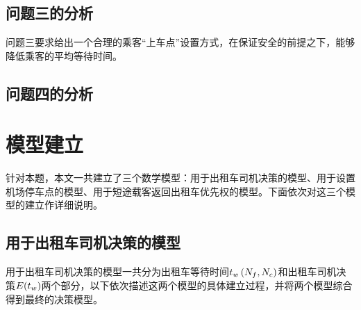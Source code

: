 \documentclass{cumcm}
\begin{document}
\subsection{问题三的分析}
问题三要求给出一个合理的乘客“上车点”设置方式，在保证安全的前提之下，能够降低乘客的平均等待时间。
\subsection{问题四的分析}

\section{模型建立}
针对本题，本文一共建立了三个数学模型：用于出租车司机决策的模型、用于设置机场停车点的模型、用于短途载客返回出租车优先权的模型。下面依次对这三个模型的建立作详细说明。
\subsection{用于出租车司机决策的模型}
用于出租车司机决策的模型一共分为出租车等待时间$\mbox{$t_w$}\left(\mbox{$N_f$},\mbox{$N_c$}\right)$和出租车司机决策$E(\mbox{$t_w$})$两个部分，以下依次描述这两个模型的具体建立过程，并将两个模型综合得到最终的决策模型。
\end{document}

